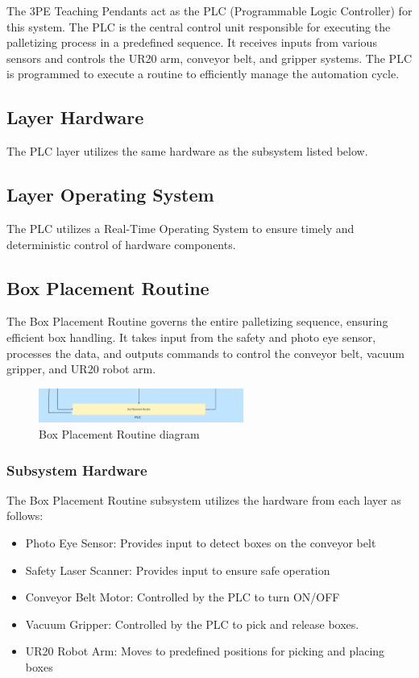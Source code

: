 

The 3PE Teaching Pendants act as the PLC (Programmable Logic Controller) for this system. The PLC is the central control unit responsible for executing the palletizing process in a predefined sequence. It receives inputs from various sensors and controls the UR20 arm, conveyor belt, and gripper systems. The PLC is programmed to execute a routine to efficiently manage the automation cycle.
\subsection{Layer Hardware}
The PLC layer utilizes the same hardware as the subsystem listed below.

\subsection{Layer Operating System}
The PLC utilizes a Real-Time Operating System to ensure timely and deterministic control of hardware components.

\subsection{Box Placement Routine}

The Box Placement Routine governs the entire palletizing sequence, ensuring efficient box handling. It takes input from the safety and photo eye sensor, processes the data, and outputs commands to control the conveyor belt, vacuum gripper, and UR20 robot arm.

\begin{figure}[h!]
	\centering
 	\includegraphics[width=0.60\textwidth]{images/plc.png}
 \caption{Box Placement Routine diagram}
\end{figure}

\subsubsection{Subsystem Hardware}
The Box Placement Routine subsystem utilizes the hardware from each layer as follows:
    \begin{itemize}
        \item Photo Eye Sensor: Provides input to detect boxes on the conveyor belt
        \item Safety Laser Scanner: Provides input to ensure safe operation
        \item Conveyor Belt Motor: Controlled by the PLC to turn ON/OFF
        \item Vacuum Gripper: Controlled by the PLC to pick and release boxes.
        \item UR20 Robot Arm: Moves to predefined positions for picking and placing boxes
    \end{itemize}

